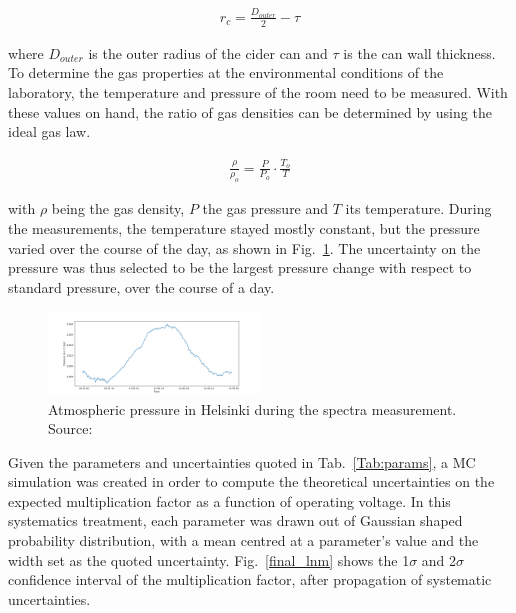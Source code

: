 \begin{align}
  \label{eq:rcra}
  r_{c} = \frac{D_{outer}}{2}-\tau
\end{align}

where $D_{outer}$ is the outer radius of the cider can and $\tau$ is the can wall thickness.
To determine the gas properties at the environmental conditions of the laboratory, the temperature and pressure of the room need to be measured. With these values on hand, the ratio of gas densities can be determined by using the ideal gas law.

\begin{align}
  \label{eq:gaslaw}
  \frac{\rho}{\rho_{o}} = \frac{P}{P_{o}}\cdot \frac{T_{o}}{T}
\end{align}

with $\rho$ being the gas density, $P$ the gas pressure and $T$ its temperature.
During the measurements, the temperature stayed mostly constant, but the pressure varied over the course of the day, as shown in Fig.~\ref{fig:pressure}. The uncertainty on the pressure was thus selected to be the largest pressure change with respect to standard pressure, over the course of a day.

\begin{figure}[htb]
  \includegraphics[width=0.5\textwidth]{graphics/pressure_monitoring.png}
  \caption{Atmospheric pressure in Helsinki during the spectra measurement. Source: \cite{meteo}}
  \label{fig:pressure}
\end{figure}

Given the parameters and uncertainties quoted in Tab.~\ref{Tab:params}, a MC simulation was created in order to compute the theoretical uncertainties on the expected multiplication factor as a function of operating voltage. In this systematics treatment, each parameter was drawn out of Gaussian shaped probability distribution, with a mean centred at a parameter's value and the width set as the quoted uncertainty. Fig.~\ref{final_lnm} shows the 1$\sigma$ and 2$\sigma$ confidence interval of the multiplication factor, after propagation of systematic uncertainties.



